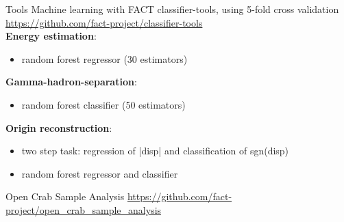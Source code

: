 \begin{frame}[t]{Tools}
Machine learning with FACT classifier-tools, using 5-fold cross validation  \url{https://github.com/fact-project/classifier-tools} \\
\textbf{{\color{tugreen} Energy estimation}}:
\begin{itemize}
    \item random forest regressor (30 estimators)
\end{itemize}
\textbf{{\color{tugreen} Gamma-hadron-separation}}:
\begin{itemize}
    \item random forest classifier (50 estimators)
\end{itemize}
\textbf{{\color{tugreen} Origin reconstruction}}:
\begin{itemize}
    \item two step task: regression of |disp| and classification of sgn(disp)
    \item random forest regressor and classifier
\end{itemize}

\begin{block}{Open Crab Sample Analysis}
    \url{https://github.com/fact-project/open_crab_sample_analysis}
\end{block}
\end{frame}

